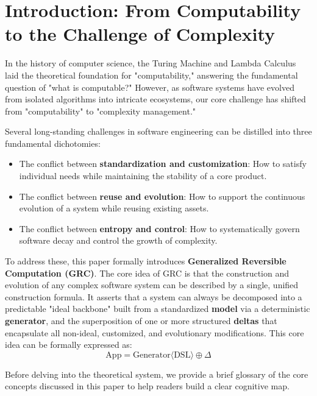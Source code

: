 \documentclass[11pt]{article}
\begin{document}
\section{Introduction: From Computability to the Challenge of Complexity}

In the history of computer science, the Turing Machine and Lambda Calculus laid the theoretical foundation for "computability," answering the fundamental question of "what is computable?" However, as software systems have evolved from isolated algorithms into intricate ecosystems, our core challenge has shifted from "computability" to "complexity management."

Several long-standing challenges in software engineering can be distilled into three fundamental dichotomies:
\begin{itemize}
    \item The conflict between \textbf{standardization and customization}: How to satisfy individual needs while maintaining the stability of a core product.
    \item The conflict between \textbf{reuse and evolution}: How to support the continuous evolution of a system while reusing existing assets.
    \item The conflict between \textbf{entropy and control}: How to systematically govern software decay and control the growth of complexity.
\end{itemize}

To address these, this paper formally introduces \textbf{Generalized Reversible Computation (GRC)}. The core idea of GRC is that the construction and evolution of any complex software system can be described by a single, unified construction formula. It asserts that a system can always be decomposed into a predictable "ideal backbone" built from a standardized \textbf{model} via a deterministic \textbf{generator}, and the superposition of one or more structured \textbf{deltas} that encapsulate all non-ideal, customized, and evolutionary modifications. This core idea can be formally expressed as:
\[
\text{App} = \text{Generator}\langle\text{DSL}\rangle \oplus \Delta
\]

Before delving into the theoretical system, we provide a brief glossary of the core concepts discussed in this paper to help readers build a clear cognitive map.
\end{document}
